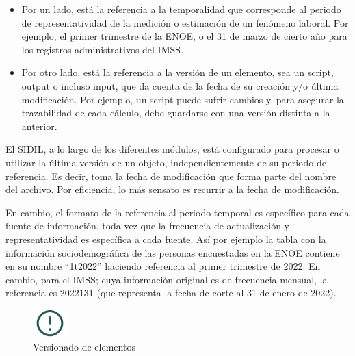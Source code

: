 \documentclass[
]{article}
\begin{document}
\begin{itemize}
\item
  Por un lado, está la referencia a la temporalidad que corresponde al periodo de representatividad de la medición o estimación de un fenómeno laboral. Por ejemplo, el primer trimestre de la ENOE, o el 31 de marzo de cierto año para los registros administrativos del IMSS.
\item
  Por otro lado, está la referencia a la versión de un elemento, sea un script, output o incluso input, que da cuenta de la fecha de su creación y/o última modificación. Por ejemplo, un script puede sufrir cambios y, para asegurar la trazabilidad de cada cálculo, debe guardarse con una versión distinta a la anterior.
\end{itemize}

El SIDIL, a lo largo de los diferentes módulos, está configurado para procesar o utilizar la última versión de un objeto, independientemente de su periodo de referencia. Es decir, toma la fecha de modificación que forma parte del nombre del archivo. Por eficiencia, lo más sensato es recurrir a la fecha de modificación.

En cambio, el formato de la referencia al periodo temporal es específico para cada fuente de información, toda vez que la frecuencia de actualización y representatividad es específica a cada fuente. Así por ejemplo la tabla con la información sociodemográfica de las personas encuestadas en la ENOE contiene en su nombre ``1t2022'' haciendo referencia al primer trimestre de 2022. En cambio, para el IMSS; cuya información original es de frecuencia mensual, la referencia es 2022131 (que representa la fecha de corte al 31 de enero de 2022).

\begin{figure}
\includegraphics[width=50px,style="float:left; background-color: #fff; padding-right:1em"]{images-1/important-icon} \caption{Versionado de elementos}\label{fig:versionadoelementos}
\end{figure}
\end{document}

